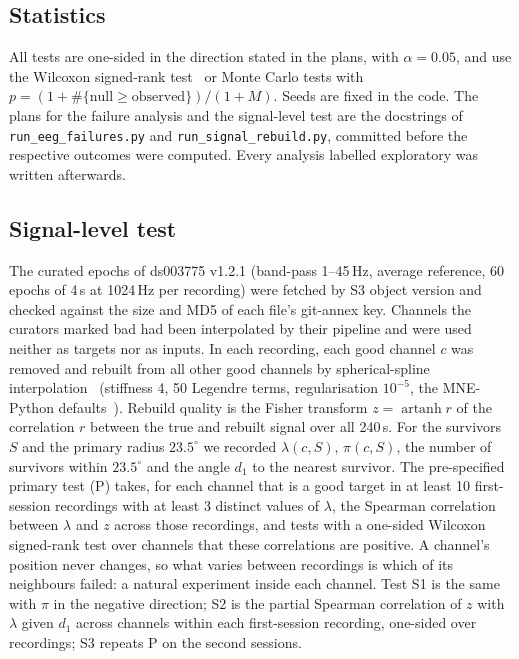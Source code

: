 \documentclass[11pt]{amsart}
\theoremstyle{definition}
\theoremstyle{remark}
\begin{document}
\subsection*{Statistics}
All tests are one-sided in the direction stated in the plans, with
$\alpha=0.05$, and use the Wilcoxon signed-rank test~\cite{Wilcoxon1945} or
Monte Carlo tests with $p=(1+\#\{\text{null}\ge\text{observed}\})/(1+M)$.
Seeds are fixed in the code. The plans for the failure analysis and the
signal-level test are the docstrings of \texttt{run\_eeg\_failures.py} and
\texttt{run\_signal\_rebuild.py}, committed before the respective outcomes
were computed. Every analysis labelled exploratory was written afterwards.

\subsection*{Signal-level test}
The curated epochs of ds003775 v1.2.1 (band-pass 1--45\,Hz, average
reference, 60 epochs of 4\,s at 1024\,Hz per recording) were fetched by S3
object version and checked against the size and MD5 of each file's
git-annex key. Channels the curators marked bad had been interpolated by
their pipeline and were used neither as targets nor as inputs. In each
recording, each good channel $c$ was removed and rebuilt from all other good
channels by spherical-spline interpolation~\cite{Perrin1989} (stiffness 4, 50
Legendre terms, regularisation $10^{-5}$, the MNE-Python
defaults~\cite{Gramfort2013}). Rebuild quality is the Fisher transform
$z=\operatorname{artanh} r$ of the correlation $r$ between the true and rebuilt
signal over all 240\,s. For the survivors $S$ and the primary radius
$23.5^\circ$ we recorded $\lambda(c,S)$, $\pi(c,S)$, the number of survivors
within $23.5^\circ$ and the angle $d_1$ to the nearest survivor. The
pre-specified primary test (P) takes, for each channel that is a good target
in at least 10 first-session recordings with at least 3 distinct values of
$\lambda$, the Spearman correlation between $\lambda$ and $z$ across those
recordings, and tests with a one-sided Wilcoxon signed-rank test over channels
that these correlations are positive. A channel's position never changes, so
what varies between recordings is which of its neighbours failed: a natural
experiment inside each channel. Test S1 is the same with $\pi$ in the negative
direction; S2 is the partial Spearman correlation of $z$ with $\lambda$ given
$d_1$ across channels within each first-session recording, one-sided over
recordings; S3 repeats P on the second sessions.
\end{document}
